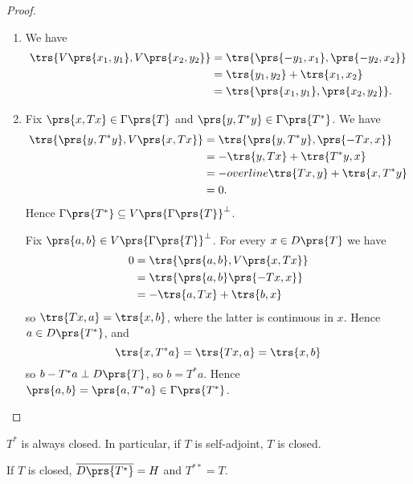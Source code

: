 \documentclass[10pt, twoside]{book}
\begin{document}
\begin{proof}
\begin{enumerate}
\item We have
\begin{align*}
\trs{V\prs{x_1, y_1}, V\prs{x_2, y_2}} &= \trs{\prs{-y_1, x_1}, \prs{-y_2, x_2}}
\\&= \trs{y_1, y_2} + \trs{x_1, x_2}
\\&= \trs{\prs{x_1, y_1}, \prs{x_2, y_2}} \text{.}
\end{align*}
\item Fix $\prs{x, Tx} \in \Gamma\prs{T}$ and $\prs{y, T^* y} \in \Gamma\prs{T^*}$.
We have
\begin{align*}
\trs{\prs{y, T^* y}, V\prs{x, Tx}} &= \trs{\prs{y, T^* y}, \prs{-Tx, x}}
\\&= -\trs{y, Tx} + \trs{T^* y, x}
\\&= -overline{\trs{Tx, y} + \trs{x, T^* y}}
\\&= 0 \text{.}
\end{align*}
Hence $\Gamma\prs{T^*} \subseteq V\prs{\Gamma\prs{T}}^\perp$.

Fix $\prs{a,b} \in V\prs{\Gamma\prs{T}}^\perp$. For every $x \in D\prs{T}$ we have
\begin{align*}
0 &= \trs{\prs{a,b}, V\prs{x, Tx}}
\\&= \trs{\prs{a,b} \prs{-Tx, x}}
\\&= - \trs{a, Tx} + \trs{b,x}
\end{align*}
so $\trs{Tx, a} = \trs{x,b}$, where the latter is continuous in $x$. Hence $a \in D\prs{T^*}$, and
\[\trs{x, T^* a} = \trs{Tx, a} = \trs{x,b}\]
so $b- T^* a \perp D\prs{T}$, so $b = T^* a$. Hence $\prs{a,b} = \prs{a,T^* a} \in \Gamma\prs{T^*}$.
\end{enumerate}
\end{proof}

\begin{corollary}
$T^*$ is always closed. In particular, if $T$ is self-adjoint, $T$ is closed.
\end{corollary}

\begin{proposition}
If $T$ is closed, $\overline{D\prs{T^*}} = H$ and $T^{**} = T$.
\end{proposition}
\end{document}
